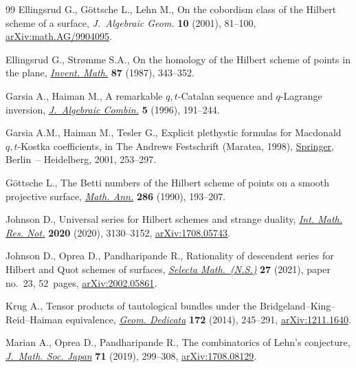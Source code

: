 \documentclass[10pt,a4paper]{amsart}
\numberwithin{equation}{section}
\begin{document}
\begin{thebibliography}{99}
Ellingsrud G., G\"ottsche L., Lehn M., On the cobordism class of the {H}ilbert
 scheme of a surface, \textit{J.~Algebraic Geom.} \textbf{10} (2001), 81--100,
 \href{https://arxiv.org/abs/math.AG/9904095}{arXiv:math.AG/9904095}.

Ellingsrud G., Str{\o}mme S.A., On the homology of the {H}ilbert scheme of
 points in the plane, \href{https://doi.org/10.1007/BF01389419}{\textit{Invent. Math.}} \textbf{87} (1987), 343--352.

Garsia A., Haiman M., A remarkable {$q,t$}-Catalan sequence and {$q$}-Lagrange
 inversion, \href{https://doi.org/10.1023/A:1022476211638}{\textit{J.~Algebraic Combin.}} \textbf{5} (1996), 191--244.

Garsia A.M., Haiman M., Tesler G., Explicit plethystic formulas for {M}acdonald
 {$q,t$}-{K}ostka coefficients, in The Andrews Festschrift (Maratea, 1998),
 \href{https://doi.org/10.1007/978-3-642-56513-7_13}{Springer}, Berlin~-- Heidelberg, 2001, 253--297.

G\"ottsche L., The {B}etti numbers of the {H}ilbert scheme of points on a
 smooth projective surface, \href{https://doi.org/10.1007/BF01453572}{\textit{Math. Ann.}} \textbf{286} (1990), 193--207.

Johnson D., Universal series for {H}ilbert schemes and strange duality,
 \href{https://doi.org/10.1093/imrn/rny101}{\textit{Int. Math. Res. Not.}} \textbf{2020} (2020), 3130--3152,
 \href{https://arxiv.org/abs/1708.05743}{arXiv:1708.05743}.

Johnson D., Oprea D., Pandharipande R., Rationality of descendent series for
 {H}ilbert and {Q}uot schemes of surfaces, \href{https://doi.org/10.1007/s00029-021-00638-1}{\textit{Selecta Math.~(N.S.)}}
 \textbf{27} (2021), paper no.~23, 52~pages, \href{https://arxiv.org/abs/2002.05861}{arXiv:2002.05861}.

Krug A., Tensor products of tautological bundles under the
 {B}ridgeland--{K}ing--{R}eid--{H}aiman equivalence, \href{https://doi.org/10.1007/s10711-013-9919-1}{\textit{Geom. Dedicata}}
 \textbf{172} (2014), 245--291, \href{https://arxiv.org/abs/1211.1640}{arXiv:1211.1640}.

Marian A., Oprea D., Pandharipande R., The combinatorics of {L}ehn's
 conjecture, \href{https://doi.org/10.2969/jmsj/78747874}{\textit{J.~Math. Soc. Japan}} \textbf{71} (2019), 299--308,
 \href{https://arxiv.org/abs/1708.08129}{arXiv:1708.08129}.


\end{thebibliography}
\end{document}
